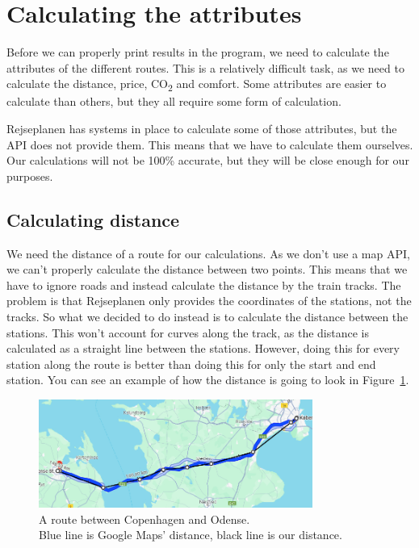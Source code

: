 \section{Calculating the attributes}\label{sec:calculations}

Before we can properly print results in the program, we need to calculate the attributes of the different routes.
This is a relatively difficult task, as we need to calculate the distance, price, \unit{CO_{2}} and comfort.
Some attributes are easier to calculate than others, but they all require some form of calculation.

Rejseplanen has systems in place to calculate some of those attributes, but the API does not provide them.
This means that we have to calculate them ourselves.
Our calculations will not be 100\% accurate, but they will be close enough for our purposes.

\subsection{Calculating distance}\label{subsec:calculating-distance}

We need the distance of a route for our calculations.
As we don't use a map API, we can't properly calculate the distance between two points.
This means that we have to ignore roads and instead calculate the distance by the train tracks.
The problem is that Rejseplanen only provides the coordinates of the stations, not the tracks.
So what we decided to do instead is to calculate the distance between the stations.
This won't account for curves along the track, as the distance is calculated as a straight line between the stations.
However, doing this for every station along the route is better than doing this for only the start and end station.
You can see an example of how the distance is going to look in Figure~\ref{fig:image-google-maps-distance-calculation}.

\begin{figure}[H]
    \centering
    \includegraphics[width=0.8\textwidth]{images/google-maps-distance-calculation.jpg}
    \caption{A route between Copenhagen and Odense. \\ Blue line is Google Maps' distance, black line is our distance.}
    \label{fig:image-google-maps-distance-calculation}
\end{figure}

